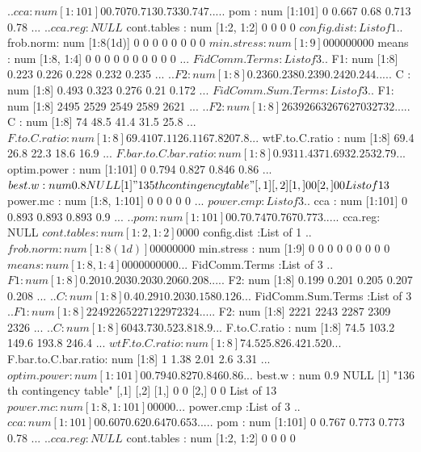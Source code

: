 \documentclass[11pt]{article} %
\begin{document}
\begin{Schunk}
\begin{Soutput}
  ..$ cca    : num [1:101] 0 0.707 0.713 0.733 0.747 ...
  ..$ pom    : num [1:101] 0 0.667 0.68 0.713 0.78 ...
  ..$ cca.reg: NULL
 $ cont.tables         : num [1:2, 1:2] 0 0 0 0
 $ config.dist         :List of 1
  ..$ frob.norm: num [1:8(1d)] 0 0 0 0 0 0 0 0
 $ min.stress          : num [1:9] 0 0 0 0 0 0 0 0 0
 $ means               : num [1:8, 1:4] 0 0 0 0 0 0 0 0 0 0 ...
 $ FidComm.Terms       :List of 3
  ..$ F1: num [1:8] 0.223 0.226 0.228 0.232 0.235 ...
  ..$ F2: num [1:8] 0.236 0.238 0.239 0.242 0.244 ...
  ..$ C : num [1:8] 0.493 0.323 0.276 0.21 0.172 ...
 $ FidComm.Sum.Terms   :List of 3
  ..$ F1: num [1:8] 2495 2529 2549 2589 2621 ...
  ..$ F2: num [1:8] 2639 2663 2676 2703 2732 ...
  ..$ C : num [1:8] 74 48.5 41.4 31.5 25.8 ...
 $ F.to.C.ratio        : num [1:8] 69.4 107.1 126.1 167.8 207.8 ...
 $ wtF.to.C.ratio      : num [1:8] 69.4 26.8 22.3 18.6 16.9 ...
 $ F.bar.to.C.bar.ratio: num [1:8] 0.931 1.437 1.693 2.253 2.79 ...
 $ optim.power         : num [1:101] 0 0.794 0.827 0.846 0.86 ...
 $ best.w              : num 0.8
NULL
[1] "135 th contingency table"
     [,1] [,2]
[1,]    0    0
[2,]    0    0
List of 13
 $ power.mc            : num [1:8, 1:101] 0 0 0 0 0 ...
 $ power.cmp           :List of 3
  ..$ cca    : num [1:101] 0 0.893 0.893 0.893 0.9 ...
  ..$ pom    : num [1:101] 0 0.7 0.747 0.767 0.773 ...
  ..$ cca.reg: NULL
 $ cont.tables         : num [1:2, 1:2] 0 0 0 0
 $ config.dist         :List of 1
  ..$ frob.norm: num [1:8(1d)] 0 0 0 0 0 0 0 0
 $ min.stress          : num [1:9] 0 0 0 0 0 0 0 0 0
 $ means               : num [1:8, 1:4] 0 0 0 0 0 0 0 0 0 0 ...
 $ FidComm.Terms       :List of 3
  ..$ F1: num [1:8] 0.201 0.203 0.203 0.206 0.208 ...
  ..$ F2: num [1:8] 0.199 0.201 0.205 0.207 0.208 ...
  ..$ C : num [1:8] 0.4 0.291 0.203 0.158 0.126 ...
 $ FidComm.Sum.Terms   :List of 3
  ..$ F1: num [1:8] 2249 2265 2271 2297 2324 ...
  ..$ F2: num [1:8] 2221 2243 2287 2309 2326 ...
  ..$ C : num [1:8] 60 43.7 30.5 23.8 18.9 ...
 $ F.to.C.ratio        : num [1:8] 74.5 103.2 149.6 193.8 246.4 ...
 $ wtF.to.C.ratio      : num [1:8] 74.5 25.8 26.4 21.5 20 ...
 $ F.bar.to.C.bar.ratio: num [1:8] 1 1.38 2.01 2.6 3.31 ...
 $ optim.power         : num [1:101] 0 0.794 0.827 0.846 0.86 ...
 $ best.w              : num 0.9
NULL
[1] "136 th contingency table"
     [,1] [,2]
[1,]    0    0
[2,]    0    0
List of 13
 $ power.mc            : num [1:8, 1:101] 0 0 0 0 0 ...
 $ power.cmp           :List of 3
  ..$ cca    : num [1:101] 0 0.607 0.62 0.647 0.653 ...
  ..$ pom    : num [1:101] 0 0.767 0.773 0.773 0.78 ...
  ..$ cca.reg: NULL
 $ cont.tables         : num [1:2, 1:2] 0 0 0 0

\end{Soutput}
\end{Schunk}
\end{document}
